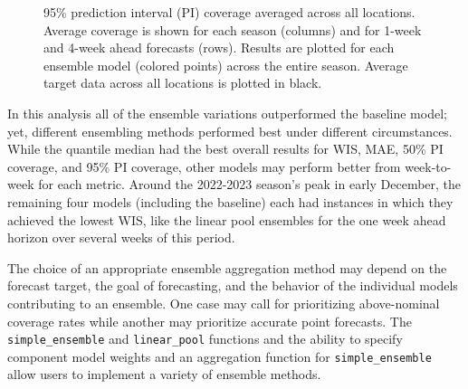 \documentclass[
]{article}
\begin{document}
\begin{figure}


\caption{\label{fig-cov95-vs-forecast-date}95\% prediction interval (PI)
coverage averaged across all locations. Average coverage is shown for
each season (columns) and for 1-week and 4-week ahead forecasts (rows).
Results are plotted for each ensemble model (colored points) across the
entire season. Average target data across all locations is plotted in
black.}

\end{figure}%

In this analysis all of the ensemble variations outperformed the
baseline model; yet, different ensembling methods performed best under
different circumstances. While the quantile median had the best overall
results for WIS, MAE, 50\% PI coverage, and 95\% PI coverage, other
models may perform better from week-to-week for each metric. Around the
2022-2023 season's peak in early December, the remaining four models
(including the baseline) each had instances in which they achieved the
lowest WIS, like the linear pool ensembles for the one week ahead
horizon over several weeks of this period.

The choice of an appropriate ensemble aggregation method may depend on
the forecast target, the goal of forecasting, and the behavior of the
individual models contributing to an ensemble. One case may call for
prioritizing above-nominal coverage rates while another may prioritize
accurate point forecasts. The \texttt{simple\_ensemble} and
\texttt{linear\_pool} functions and the ability to specify component
model weights and an aggregation function for \texttt{simple\_ensemble}
allow users to implement a variety of ensemble methods.
\end{document}
